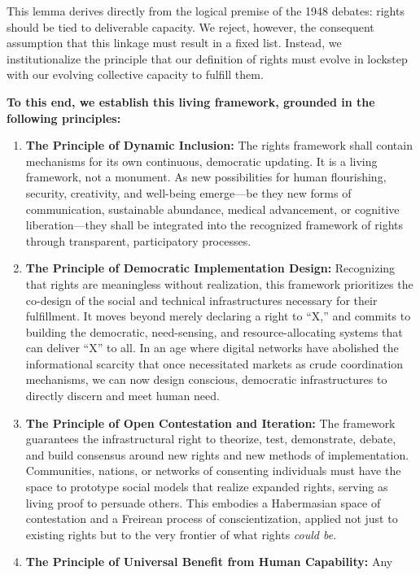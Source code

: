This lemma derives directly from the logical premise of the 1948
debates: rights should be tied to deliverable capacity. We reject,
however, the consequent assumption that this linkage must result in a
fixed list. Instead, we institutionalize the principle that our
definition of rights must evolve in lockstep with our evolving
collective capacity to fulfill them.

\textbf{To this end, we establish this living framework, grounded in the
following principles:}

\begin{enumerate}
\def\labelenumi{\arabic{enumi}.}
\item
  \textbf{The Principle of Dynamic Inclusion:} The rights framework
  shall contain mechanisms for its own continuous, democratic updating.
  It is a living framework, not a monument. As new possibilities for
  human flourishing, security, creativity, and well-being emerge---be
  they new forms of communication, sustainable abundance, medical
  advancement, or cognitive liberation---they shall be integrated into
  the recognized framework of rights through transparent, participatory
  processes.
\item
  \textbf{The Principle of Democratic Implementation Design:}
  Recognizing that rights are meaningless without realization, this
  framework prioritizes the co-design of the social and technical
  infrastructures necessary for their fulfillment. It moves beyond
  merely declaring a right to ``X,'' and commits to building the
  democratic, need-sensing, and resource-allocating systems that can
  deliver ``X'' to all. In an age where digital networks have abolished
  the informational scarcity that once necessitated markets as crude
  coordination mechanisms, we can now design conscious, democratic
  infrastructures to directly discern and meet human need.
\item
  \textbf{The Principle of Open Contestation and Iteration:} The
  framework guarantees the infrastructural right to theorize, test,
  demonstrate, debate, and build consensus around new rights and new
  methods of implementation. Communities, nations, or networks of
  consenting individuals must have the space to prototype social models
  that realize expanded rights, serving as living proof to persuade
  others. This embodies a Habermasian space of contestation and a
  Freirean process of conscientization, applied not just to existing
  rights but to the very frontier of what rights \emph{could be}.
\item
  \textbf{The Principle of Universal Benefit from Human Capability:} Any

\end{enumerate}
